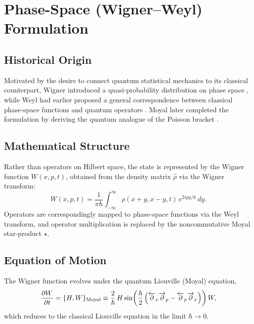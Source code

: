 \documentclass[11pt,a4paper]{article}
\begin{document}
\section{Phase-Space (Wigner--Weyl) Formulation}

\subsection{Historical Origin}

Motivated by the desire to connect quantum statistical mechanics to its classical counterpart, Wigner introduced a quasi-probability distribution on phase space \citep{wigner1932}, while Weyl had earlier proposed a general correspondence between classical phase-space functions and quantum operators \citep{weyl1927}. Moyal later completed the formulation by deriving the quantum analogue of the Poisson bracket \citep{moyal1949}.

\subsection{Mathematical Structure}

Rather than operators on Hilbert space, the state is represented by the Wigner function $W(x,p,t)$, obtained from the density matrix $\hat{\rho}$ via the Wigner transform:
\begin{equation}
    W(x,p,t) = \frac{1}{\pi\hbar}\int_{-\infty}^{\infty} \rho\!\left(x+y, x-y, t\right)\, e^{2ipy/\hbar}\, dy .
\end{equation}
Operators are correspondingly mapped to phase-space functions via the Weyl transform, and operator multiplication is replaced by the noncommutative Moyal star-product $\star$.

\subsection{Equation of Motion}

The Wigner function evolves under the quantum Liouville (Moyal) equation,
\begin{equation}
    \pdv{W}{t} = \{H, W\}_{\text{Moyal}} \equiv \frac{2}{\hbar}\, H \sin\!\left(\frac{\hbar}{2}\left(\overleftarrow{\partial}_x \overrightarrow{\partial}_p - \overleftarrow{\partial}_p \overrightarrow{\partial}_x\right)\right) W,
\end{equation}
which reduces to the classical Liouville equation in the limit $\hbar \to 0$.
\end{document}
